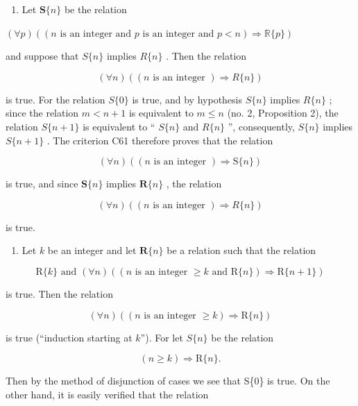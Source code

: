 \begin{enumerate}
\def\labelenumi{(\arabic{enumi})}
\tightlist
\item
  Let \(\mathbf{S}\{n\}\) be the relation
\end{enumerate}

\((\forall p)((n \text{ is an integer and } p \text{ is an integer and } p < n) \Longrightarrow \mathbb{R}\{p\})\)

and suppose that \(S\{n\}\) implies \(R\{n\}\) . Then the relation

\[
(\forall n) ((n \text {   is   an   integer   }) \Longrightarrow R \{n \})
\]

is true. For the relation \(S\{0\}\) is true, and by hypothesis \(S\{n\}\) implies \(R\{n\}\) ; since the relation \(m < n + 1\) is equivalent to \(m \leqslant n\) (no. 2, Proposition 2), the relation \(S\{n + 1\}\) is equivalent to `` \(S\{n\}\) and \(R\{n\}\) '', consequently, \(S\{n\}\) implies \(S\{n + 1\}\) . The criterion C61 therefore proves that the relation

\[
(\forall n) ((n \text {   is   an   integer   }) \Longrightarrow \mathrm{S} \{n \})
\]

is true, and since \(\mathbf{S}\{n\}\) implies \(\mathbf{R}\{n\}\) , the relation

\[
(\forall n) ((n \text {   is   an   integer   }) \Longrightarrow R \{n \})
\]

is true.

\begin{enumerate}
\def\labelenumi{(\arabic{enumi})}
\setcounter{enumi}{1}
\tightlist
\item
  Let \(k\) be an integer and let \(\mathbf{R}\{n\}\) be a relation such that the relation
\end{enumerate}

\[
\mathrm{R} \{k \} \text { and } (\forall n) ((n \text { is   an   integer } \geqslant k \text { and } \mathrm{R} \{n \}) \Longrightarrow \mathrm{R} \{n + 1 \})
\]

is true. Then the relation

\[
(\forall n) ((n \text {   is   an   integer   } \geqslant k) \Longrightarrow \mathrm{R} \{n \})
\]

is true (``induction starting at \(k\)''). For let \(S\{n\}\) be the relation

\[
(n \geqslant k) \Longrightarrow \mathrm{R} \{n \}.
\]

Then by the method of disjunction of cases we see that S\{0\} is true. On the other hand, it is easily verified that the relation

